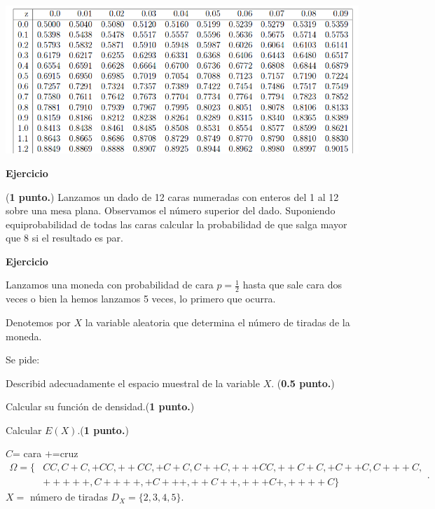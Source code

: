 \documentclass[12pt,spanish,es-nodecimaldot]{article}\usepackage[]{graphicx}\usepackage[]{color}
\newcounter{problemes}
\newcounter{punts} \def\thepunts{\arabic{punts}}
\def\probl{\textbf{\newline\noindent\hspace{-1cm} Ejercicio}\addtocounter{problemes}{1} \setcounter{punts}{0}
\medskip\noindent{\bf \theproblemes) }}
\def\punt{\addtocounter{punts}{1} \smallskip{\emph{\thepunts) }}}
\newif\ifsol
\begin{document}
 \includegraphics[scale=0.4]{normal1examen.jpg}

\ifsol
$$\begin{aligned}
P(20< \overline{X}<25 /\overline{X}>20)&=\frac{P(20< \overline{X}<25\cap \overline{X}>20)}{1-P( \overline{X}\leq 20))}\\
&=\frac{F_Z\left(\frac{25-20}{\frac{50}{\sqrt{100}}}\right)-F_Z\left(\frac{20-20}{\frac{50}{\sqrt{100}}}\right)}{1-F_Z\left(\frac{20-20}{\frac{50}{\sqrt{100}}}\right)}=
\frac{F_Z(1)-F_Z(0)}{F_Z(0)}.
\end{aligned}$$
\fi


\probl (\textbf{1 punto.}) Lanzamos un dado de 12 caras numeradas  con enteros del 1 al 12 sobre una mesa plana. Observamos el número superior del dado. Suponiendo equiprobabilidad de todas las caras calcular la probabilidad de que salga mayor que 8  si el resultado es par.

\ifsol
$$ P(X>8/X\in\{2,4,6,8,10,12\})=\frac{P(X\in\{10,12\})}{P(X\in\{2,4,6,8,10,12\})}=\frac{2/12}{6/12}=\frac{1}{3}.$$
\fi

\vspace{3cm}

\probl Lanzamos una moneda con probabilidad de cara $p=\frac{1}{2}$ hasta que sale cara dos veces  o bien la hemos lanzamos 5 veces, lo primero que ocurra.

Denotemos por $X$ la variable aleatoria que determina el número de tiradas de la moneda.

Se pide: 

\punt Describid adecuadamente el espacio muestral de la variable $X$. (\textbf{0.5 punto.})

\punt Calcular  su función de densidad.(\textbf{1 punto.})

\punt Calcular $E(X)$.(\textbf{1 punto.})

\ifsol

$C$= cara $+$=cruz 
$$\begin{aligned}\Omega=\{&CC,C+C,+CC,++CC,+C+C,C++C,+++CC,++C+C,+C++C,C+++C,\\ & +++++,C++++,+C+++,++C++,+++C+,++++C\}\end{aligned}.$$
$X=$ número de tiradas $D_X=\{2,3,4,5\}.$
\end{document}
